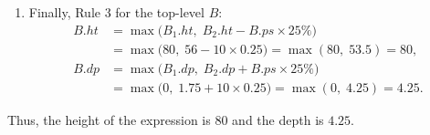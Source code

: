 \begin{enumerate}
    \item Finally, Rule 3 for the top-level $B$:
    \begin{align*}
        B.\mathit{ht} &= \max\bigl(B_1.\mathit{ht},\; B_2.\mathit{ht} - B.\mathit{ps} \times 25\%\bigr) \\
                      &= \max\bigl(80,\; 56 - 10 \times 0.25\bigr) = \max(80,\; 53.5) = \boxed{80}, \\
        B.\mathit{dp} &= \max\bigl(B_1.\mathit{dp},\; B_2.\mathit{dp} + B.\mathit{ps} \times 25\%\bigr) \\
                      &= \max\bigl(0,\; 1.75 + 10 \times 0.25\bigr) = \max(0,\; 4.25) = \boxed{4.25}.
    \end{align*}
\end{enumerate}

Thus, the height of the expression is $80$ and the depth is $4.25$.